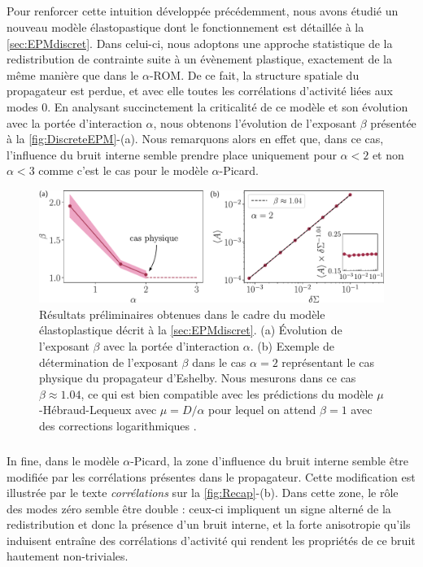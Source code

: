 \subparagraph{}Pour renforcer cette intuition développée précédemment, nous avons étudié un nouveau modèle élastopastique dont le fonctionnement est détaillée à la \autoref{sec:EPMdiscret}. Dans celui-ci, nous adoptons une approche statistique de la redistribution de contrainte suite à un évènement plastique, exactement de la même manière que dans le $\alpha$-ROM. De ce fait, la structure spatiale du propagateur est perdue, et avec elle toutes les corrélations d'activité liées aux modes 0. En analysant succinctement la criticalité de ce modèle et son évolution avec la portée d’interaction $\alpha$, nous obtenons l'évolution de l'exposant $\beta$ présentée à la \autoref{fig:DiscreteEPM}-(a). Nous remarquons alors en effet que, dans ce cas, l'influence du bruit interne semble prendre place uniquement pour $\alpha < 2$ et non $\alpha < 3$ comme c'est le cas pour le modèle $\alpha$-Picard.

\begin{figure}[h]
	\centering
	\includegraphics[width=\textwidth]{Chapitre5/Figures/DiscreteEPM.pdf}
	\caption{Résultats préliminaires obtenues dans le cadre du modèle élastoplastique décrit à la \autoref{sec:EPMdiscret}. (a) Évolution de l'exposant $\beta$ avec la portée d'interaction $\alpha$. (b) Exemple de détermination de l'exposant $\beta$ dans le cas $\alpha = 2$ représentant le cas physique du propagateur d'Eshelby. Nous mesurons dans ce cas $\beta \approx 1.04$, ce qui est bien compatible avec les prédictions du modèle $\mu$-Hébraud-Lequeux avec $\mu = D/\alpha$ pour lequel on attend $\beta = 1$ avec des corrections logarithmiques \cite{lin_microscopic_2018}.}
	\label{fig:DiscreteEPM}
\end{figure}

\subparagraph{}In fine, dans le modèle $\alpha$-Picard, la zone d'influence du bruit interne semble être modifiée par les corrélations présentes dans le propagateur. Cette modification est illustrée par le texte \textit{corrélations} sur la \autoref{fig:Recap}-(b). Dans cette zone, le rôle des modes zéro semble être double : ceux-ci impliquent un signe alterné de la redistribution et donc la présence d'un bruit interne, et la forte anisotropie qu'ils induisent entraîne des corrélations d'activité qui rendent les propriétés de ce bruit hautement non-triviales.

